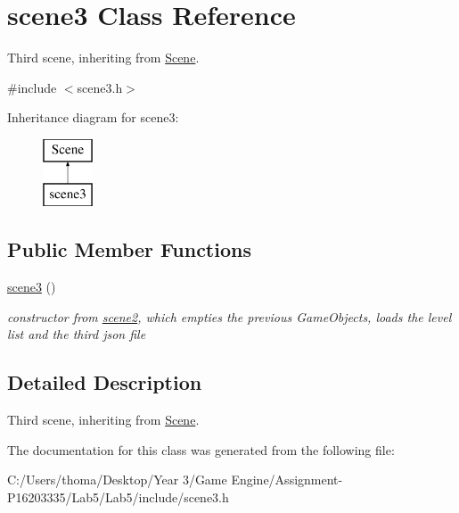\hypertarget{classscene3}{}\section{scene3 Class Reference}
\label{classscene3}


Third scene, inheriting from \mbox{\hyperlink{class_scene}{Scene}}.  




{\ttfamily \#include $<$scene3.\+h$>$}

Inheritance diagram for scene3\+:\begin{figure}[H]
\begin{center}
\leavevmode
\includegraphics[height=2.000000cm]{classscene3}
\end{center}
\end{figure}
\subsection*{Public Member Functions}
\begin{DoxyCompactItemize}
\item 
\mbox{\label{classscene3_a8c4b641aab6db455b855672b625c424c}} 
\mbox{\hyperlink{classscene3_a8c4b641aab6db455b855672b625c424c}{scene3}} ()
\begin{DoxyCompactList}\small\item\em constructor from \mbox{\hyperlink{classscene2}{scene2}}, which empties the previous Game\+Objects, loads the level list and the third json file \end{DoxyCompactList}\end{DoxyCompactItemize}


\subsection{Detailed Description}
Third scene, inheriting from \mbox{\hyperlink{class_scene}{Scene}}. 

The documentation for this class was generated from the following file\+:\begin{DoxyCompactItemize}
\item 
C\+:/\+Users/thoma/\+Desktop/\+Year 3/\+Game Engine/\+Assignment-\/\+P16203335/\+Lab5/\+Lab5/include/scene3.\+h\end{DoxyCompactItemize}
